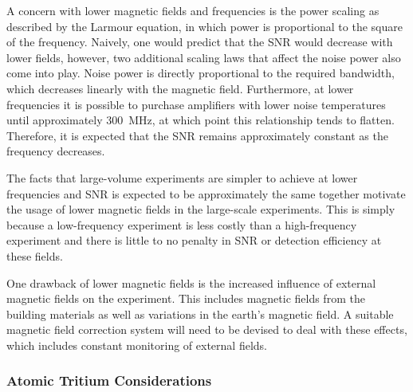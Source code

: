 A concern with lower magnetic fields and frequencies is the power scaling as described by the Larmour equation, in which power is proportional to the square of the frequency. Naively, one would predict that the SNR would decrease with lower fields, however, two additional scaling laws that affect the noise power also come into play. Noise power is directly proportional to the required bandwidth, which decreases linearly with the magnetic field. Furthermore, at lower frequencies it is possible to purchase amplifiers with lower noise temperatures until approximately 300~MHz, at which point this relationship tends to flatten. Therefore, it is expected that the SNR remains approximately constant as the frequency decreases.

The facts that large-volume experiments are simpler to achieve at lower frequencies and SNR is expected to be approximately the same together motivate the usage of lower magnetic fields in the large-scale experiments. This is simply because a low-frequency experiment is less costly than a high-frequency experiment and there is little to no penalty in SNR or detection efficiency at these fields.

One drawback of lower magnetic fields is the increased influence of external magnetic fields on the experiment. This includes magnetic fields from the building materials as well as variations in the earth's magnetic field. A suitable magnetic field correction system will need to be devised to deal with these effects, which includes constant monitoring of external fields.

\subsubsection*{Atomic Tritium Considerations}

